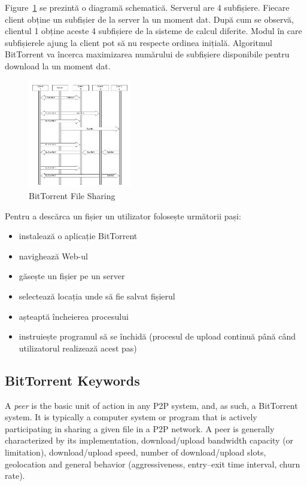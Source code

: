 Figure~\ref{fig:p2p-systems:bittorrent-sharing} se prezintă o diagramă
schematică.  Serverul are 4 subfișiere. Fiecare client obține un subfișier de
la server la un moment dat.  După cum se observă, clientul 1 obține aceste 4
subfișiere de la sisteme de calcul diferite. Modul în care subfișierele ajung
la client pot să nu respecte ordinea inițială. Algoritmul BitTorrent va
încerca maximizarea numărului de subfișiere disponibile pentru download la un
moment dat.

\begin{figure}
  \centering
  \includegraphics[width=0.4\textwidth]{src/img/p2p-systems/bittorrent-sharing}
  \caption{BitTorrent File Sharing}
  \label{fig:p2p-systems:bittorrent-sharing}
\end{figure}

Pentru a descărca un fișier un utilizator folosește următorii pași:

\begin{itemize}
  \item instalează o aplicație BitTorrent
  \item navighează Web-ul
  \item găsește un fișier pe un server
  \item selectează locația unde să fie salvat fișierul
  \item așteaptă încheierea procesului
  \item instruiește programul să se închidă (procesul de upload continuă până
  când utilizatorul realizează acest pas)
\end{itemize}

\subsection{BitTorrent Keywords}

A \textit{peer} is the basic unit of action in any P2P system, and, as such, a
BitTorrent system. It is typically a computer system or program that is
actively participating in sharing a given file in a P2P network. A peer is
generally characterized by its implementation, download/upload bandwidth
capacity (or limitation), download/upload speed, number of download/upload
slots, geolocation and general behavior (aggressiveness, entry--exit time
interval, churn rate).


